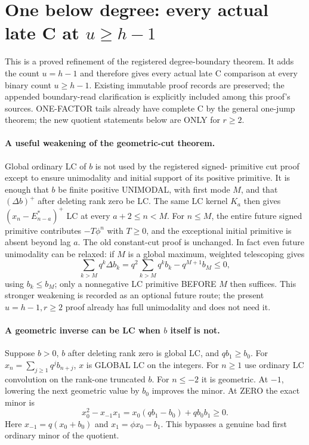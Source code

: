 \section{One below degree: every actual late C at $u\ge h-1$}
This is a proved refinement of the registered degree-boundary theorem.
It adds the count $u=h-1$ and therefore gives every actual late C
comparison at every binary count $u\ge h-1$. Existing immutable
proof records are preserved; the appended boundary-read clarification
is explicitly included among this proof's sources.
ONE-FACTOR tails already have complete C by the general one-jump
theorem; the new quotient statements below are ONLY for $r\ge2$.

\paragraph{A useful weakening of the geometric-cut theorem.}
Global ordinary LC of $b$ is not used by the registered signed-
primitive cut proof except to ensure unimodality and initial support
of its positive primitive. It is enough that $b$ be finite positive
UNIMODAL, with first mode $M$, and that $(\Delta b)^+$ after deleting
rank zero be LC. The same LC kernel $K_a$ then gives
$(x_n-E^*_{n-a})^+$ LC at every $a+2\le n<M$.
For $n\le M$, the entire future signed primitive contributes
$-T\phi^n$ with $T\ge0$, and the exceptional initial primitive is
absent beyond lag $a$. The old constant-cut proof is unchanged.
In fact even future unimodality can be relaxed: if $M$ is a global
maximum, weighted telescoping gives
\[
 \sum_{k>M}q^k\Delta b_k
 =q^2\sum_{k>M}q^kb_k-q^{M+1}b_M\le0,
\]
using $b_k\le b_M$; only a nonnegative LC primitive BEFORE $M$
then suffices. This stronger weakening is recorded as an
optional future route; the present $u=h-1,r\ge2$ proof already
has full unimodality and does not need it.

\paragraph{A geometric inverse can be LC when $b$ itself is not.}
Suppose $b>0$, $b$ after deleting rank zero is global LC, and
$qb_1\ge b_0$. For $x_n=\sum_{j\ge1}q^jb_{n+j}$,
$x$ is GLOBAL LC on the integers. For $n\ge1$ use ordinary LC
convolution on the rank-one truncated $b$. For $n\le-2$ it is
geometric. At $-1$, lowering the next geometric value by $b_0$
improves the minor. At ZERO the exact minor is
\[
 x_0^2-x_{-1}x_1
       =x_0(qb_1-b_0)+qb_0b_1\ge0.                  \tag{1}
\]
Here $x_{-1}=q(x_0+b_0)$ and $x_1=\phi x_0-b_1$.
This bypasses a genuine bad first ordinary minor of the quotient.

